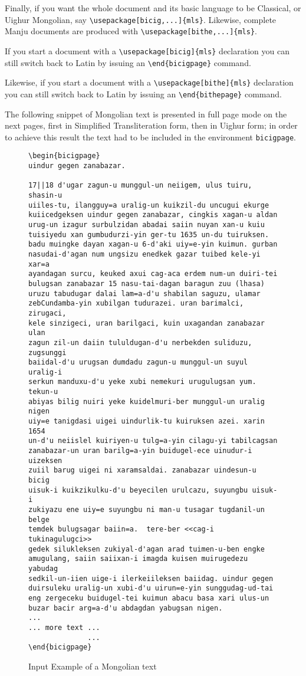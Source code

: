 \documentclass[11pt,a4paper]{article}
\begin{document}
Finally, if you want the whole document and its basic language to be
Classical, or Uighur Mongolian, say \verb|\usepackage[bicig,...]{mls}|.
Likewise, complete Manju documents are produced with 
\verb|\usepackage[bithe,...]{mls}|.

If you start a document with a \verb|\usepackage[bicig]{mls}|
declaration you can still switch back to Latin by issuing an
\verb|\end{bicigpage}| command.

Likewise, if you start a document with a \verb|\usepackage[bithe]{mls}|
declaration you can still switch back to Latin by issuing an
\verb|\end{bithepage}| command.

The following snippet of Mongolian text is presented in full
page mode on the next pages, first in Simplified Transliteration form, then
in Uighur form; in order to achieve this result the text had to be
included in the environment \texttt{bicigpage}.

\noindent
\begin{figure}
\begin{verbatim}
\begin{bicigpage}
uindur gegen zanabazar.

17||18 d'ugar zagun-u munggul-un neiigem, ulus tuiru, shasin-u
uiiles-tu, ilangguy=a uralig-un kuikzil-du uncugui ekurge
kuiicedgeksen uindur gegen zanabazar, cingkis xagan-u aldan
urug-un izagur surbulzidan abadai saiin nuyan xan-u kuiu
tuisiyedu xan gumbudurzi-yin ger-tu 1635 un-du tuiruksen.
badu muingke dayan xagan-u 6-d'aki uiy=e-yin kuimun. gurban
nasudai-d'agan num ungsizu enedkek gazar tuibed kele-yi xar=a
ayandagan surcu, keuked axui cag-aca erdem num-un duiri-tei
bulugsan zanabazar 15 nasu-tai-dagan baragun zuu (lhasa)
uruzu tabudugar dalai lam=a-d'u shabilan saguzu, ulamar
zebCundamba-yin xubilgan tudurazei. uran barimalci, zirugaci,
kele sinzigeci, uran barilgaci, kuin uxagandan zanabazar ulan
zagun zil-un daiin tululdugan-d'u nerbekden suliduzu, zugsunggi
baiidal-d'u urugsan dumdadu zagun-u munggul-un suyul uralig-i
serkun manduxu-d'u yeke xubi nemekuri urugulugsan yum. tekun-u
abiyas bilig nuiri yeke kuidelmuri-ber munggul-un uralig nigen
uiy=e tanigdasi uigei uindurlik-tu kuiruksen azei. xarin 1654
un-d'u neiislel kuiriyen-u tulg=a-yin cilagu-yi tabilcagsan
zanabazar-un uran barilg=a-yin buidugel-ece uinudur-i uizeksen
zuiil barug uigei ni xaramsaldai. zanabazar uindesun-u bicig
uisuk-i kuikzikulku-d'u beyecilen urulcazu, suyungbu uisuk-i
zukiyazu ene uiy=e suyungbu ni man-u tusagar tugdanil-un belge
temdek bulugsagar baiin=a.  tere-ber <<cag-i tukinagulugci>>
gedek silukleksen zukiyal-d'agan arad tuimen-u-ben engke
amugulang, saiin saiixan-i imagda kuisen muirugedezu yabudag
sedkil-un-iien uige-i ilerkeiileksen baiidag. uindur gegen
duirsuleku uralig-un xubi-d'u uirun=e-yin sunggudag-ud-tai
eng zergeceku buidugel-tei kuimun abacu basa xari ulus-un
buzar bacir arg=a-d'u abdagdan yabugsan nigen.
...
... more text ...
              ...
\end{bicigpage}
\end{verbatim}
\caption{Input Example of a Mongolian text}
\end{figure}
\end{document}
